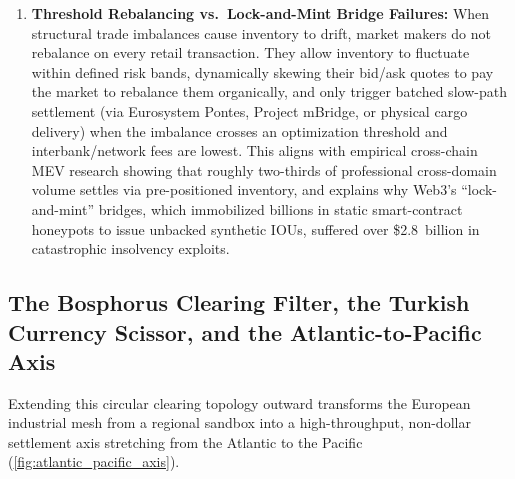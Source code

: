 \documentclass[a4paper,11pt,twoside,parskip=half-,headings=small]{scrartcl}
\begin{document}
\begin{enumerate}[nosep]
  \item \textbf{Threshold Rebalancing vs.\ Lock-and-Mint Bridge Failures:} When structural trade imbalances cause inventory to drift, market makers do not rebalance on every retail transaction. They allow inventory to fluctuate within defined risk bands, dynamically skewing their bid/ask quotes to pay the market to rebalance them organically, and only trigger batched slow-path settlement (via Eurosystem Pontes, Project mBridge, or physical cargo delivery) when the imbalance crosses an optimization threshold and interbank/network fees are lowest. This aligns with empirical cross-chain MEV research showing that roughly two-thirds of professional cross-domain volume settles via pre-positioned inventory, and explains why Web3's ``lock-and-mint'' bridges, which immobilized billions in static smart-contract honeypots to issue unbacked synthetic IOUs, suffered over \$2.8~billion in catastrophic insolvency exploits.
\end{enumerate}

\subsection{The Bosphorus Clearing Filter, the Turkish Currency Scissor, and the Atlantic-to-Pacific Axis}
\label{sec:bosphorus_mbridge_corridor}

Extending this circular clearing topology outward transforms the European industrial mesh from a regional sandbox into a high-throughput, non-dollar settlement axis stretching from the Atlantic to the Pacific (\cref{fig:atlantic_pacific_axis}).
\end{document}
